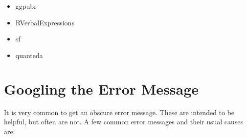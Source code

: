 \documentclass[
]{book}
\providecommand{\tightlist}{%
  \setlength{\itemsep}{0pt}\setlength{\parskip}{0pt}}
\begin{document}
\begin{itemize}
\tightlist
\item
  ggpubr
\item
  RVerbalExpressions
\item
  sf
\item
  quanteda
\end{itemize}

\hypertarget{googling-the-error-message}{%
\section{Googling the Error Message}\label{googling-the-error-message}}

It is very common to get an obscure error message. These are intended to be helpful, but often are not. A few common error messages and their usual causes are:
\end{document}
